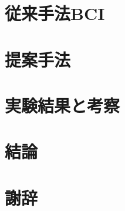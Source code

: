 \documentclass[a4j,11turept, oneside, openany, report]{jsbook}
\begin{document}
\chapter{{\mc 従来手法}{\rm BCI}}



\chapter{\mc 提案手法}


% 
% 

\chapter{\mc 実験結果と考察}

% 


\chapter{\mc 結論}


%
\chapter*{謝辞}



\end{document}
